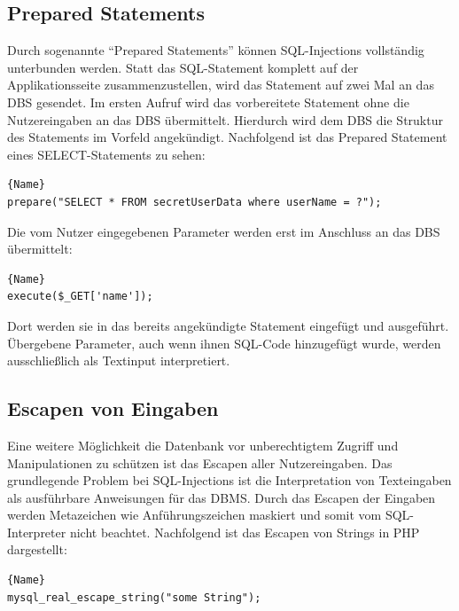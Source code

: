 \subsection{Prepared Statements}
Durch sogenannte \enquote{Prepared Statements} können SQL-Injections vollständig unterbunden werden. Statt das SQL-Statement komplett auf der Applikationsseite zusammenzustellen, wird das Statement auf zwei Mal an das DBS gesendet. Im ersten Aufruf wird das vorbereitete Statement ohne die Nutzereingaben an das DBS übermittelt. Hierdurch wird dem DBS die Struktur des Statements im Vorfeld angekündigt. Nachfolgend ist das Prepared Statement eines SELECT-Statements zu sehen:
\begin{lstlisting}[caption=Prepared Statement]{Name}
prepare("SELECT * FROM secretUserData where userName = ?");
\end{lstlisting}

Die vom Nutzer eingegebenen Parameter werden erst im Anschluss an das DBS übermittelt:
\begin{lstlisting}[caption=Übergabe der Parameter]{Name}
execute($_GET['name']);
\end{lstlisting}
Dort werden sie in das bereits angekündigte Statement eingefügt und ausgeführt. Übergebene Parameter, auch wenn ihnen SQL-Code hinzugefügt wurde, werden ausschließlich als Textinput interpretiert. 
\subsection{Escapen von Eingaben}
Eine weitere Möglichkeit die Datenbank vor unberechtigtem Zugriff und Manipulationen zu schützen ist das Escapen aller Nutzereingaben.
Das grundlegende Problem bei SQL-Injections ist die Interpretation von Texteingaben als ausführbare Anweisungen für das DBMS. Durch das Escapen der Eingaben werden Metazeichen wie Anführungszeichen maskiert und somit vom SQL-Interpreter nicht beachtet. Nachfolgend ist das Escapen von Strings in PHP dargestellt:
\begin{lstlisting}[caption=Escapen von Strings in PHP]{Name}
mysql_real_escape_string("some String");
\end{lstlisting}
